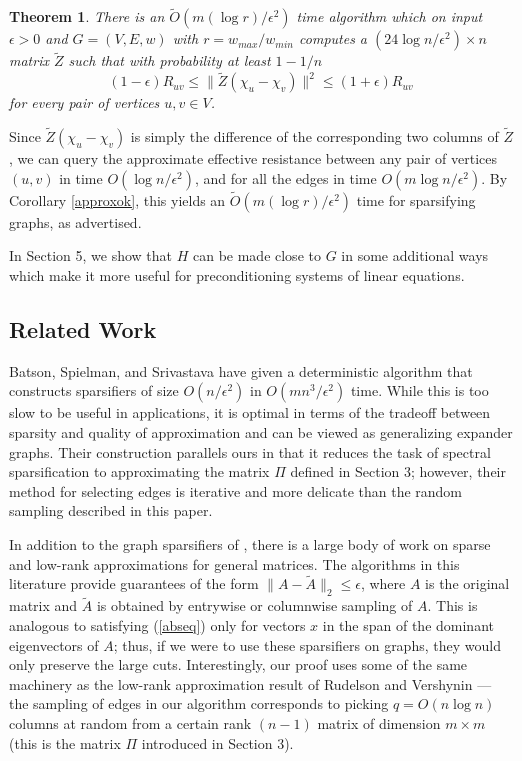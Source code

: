 \documentclass[11pt]{article}
\newtheorem{thm}[lem]{Theorem}
\newcommand{\Otilde}{\widetilde{O}}
\newcommand{\Ztilde}{\widetilde{Z}}
\begin{document}
\begin{thm}\label{th2}  There is an $\Otilde(m (\log r)/\epsilon^2)$
time algorithm which on input $\epsilon>0$ and $G=(V,E,w)$ with
  $r = w_{max} / w_{min}$  computes a 
$(24\log n/\epsilon^2)\times n$ matrix $\Ztilde $
such that with probability at least $1-1/n$
 \[ (1-\epsilon)R_{uv}\le \|\Ztilde (\chi_u-\chi_v)\|^2\le (1+\epsilon)R_{uv}\]
 for every pair of vertices $u,v\in V$.
\end{thm} 
Since $\Ztilde(\chi_u-\chi_v)$ is simply the difference of the corresponding two columns
  of $\Ztilde$,
we can query the approximate effective resistance between any pair of
vertices $(u,v)$ in time $O(\log n/\epsilon^2)$, and for all the edges in time $O(m\log n/\epsilon^2)$.
By Corollary \ref{approxok}, this yields an $\Otilde(m (\log r)/ \epsilon^{2})$
time for sparsifying graphs, as advertised.

In Section 5, we show that $H$ can be made close to $G$  in some additional
  ways which make it more useful for preconditioning systems of linear equations.

\subsection{Related Work}
Batson, Spielman, and Srivastava \cite{bss} have given a deterministic 
  algorithm that constructs sparsifiers of size $O(n/\epsilon^2)$ in 
  $O(mn^3/\epsilon^2)$ time. 
While this is too slow to be useful in applications, it is 
  optimal in terms of the tradeoff between sparsity and quality of 
  approximation and can be viewed as generalizing expander graphs.
Their construction parallels ours in that it reduces the task of spectral sparsification to approximating the matrix
  $\Pi$ defined in Section 3; however, their method for selecting edges is iterative
  and more delicate than the random sampling described in this paper.

In addition to the graph sparsifiers of \cite{bk,bss,st04},
there is a large body of work on sparse \cite{ahk,am} and low-rank
\cite{fkv,am,rudversh,drineas, drineas03pass} 
approximations for general matrices. The
algorithms in this literature provide guarantees of the form $\|A-\tilde{A}\|_2\le\epsilon$, where $A$ is the original
matrix and $\tilde{A}$ is obtained by entrywise or columnwise sampling of $A$. This is 
analogous to 
  satisfying (\ref{abseq}) only for vectors $x$ in the span of the dominant eigenvectors of $A$; thus,
if we were to use these sparsifiers on graphs, they would only preserve the large cuts. Interestingly, our proof
uses some of the same machinery as the low-rank approximation result of Rudelson and Vershynin \cite{rudversh} --- the
sampling of edges in our algorithm corresponds to picking $q=O(n\log n)$ columns at random from a 
certain rank $(n-1)$ matrix of dimension $m\times m$ (this is the matrix $\Pi$
introduced in Section 3).
\end{document}
